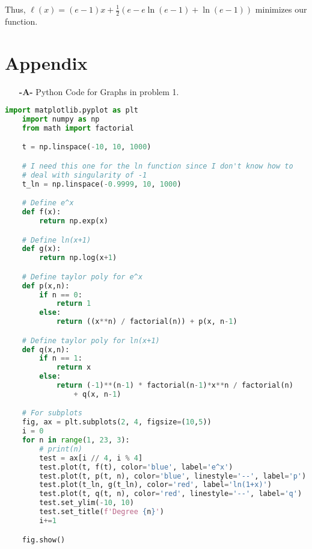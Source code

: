 \documentclass[11pt]{article}
\theoremstyle{definition}
\newcommand{\1}[1]{\mathbf{1} \left \{ #1 \right \}}
\begin{document}
Thus, \(\ell(x) = (e - 1)x + \frac{1}{2}\left(e - e\ln(e-1) + \ln(e-1)\right)\) minimizes our function.

\pagebreak

\section{Appendix}

\begin{itemize}
    \item[{\textbf{-A-}}] Python Code for Graphs in problem 1.
\end{itemize}
\begin{lstlisting}[language=Python]
    import matplotlib.pyplot as plt
    import numpy as np
    from math import factorial

    t = np.linspace(-10, 10, 1000)

    # I need this one for the ln function since I don't know how to
    # deal with singularity of -1
    t_ln = np.linspace(-0.9999, 10, 1000)

    # Define e^x
    def f(x):
        return np.exp(x)

    # Define ln(x+1)
    def g(x):
        return np.log(x+1)

    # Define taylor poly for e^x
    def p(x,n):
        if n == 0:
            return 1
        else:
            return ((x**n) / factorial(n)) + p(x, n-1)

    # Define taylor poly for ln(x+1)
    def q(x,n):
        if n == 1:
            return x
        else:
            return (-1)**(n-1) * factorial(n-1)*x**n / factorial(n)
                + q(x, n-1)

    # For subplots
    fig, ax = plt.subplots(2, 4, figsize=(10,5))
    i = 0
    for n in range(1, 23, 3):
        # print(n)
        test = ax[i // 4, i % 4]
        test.plot(t, f(t), color='blue', label='e^x')
        test.plot(t, p(t, n), color='blue', linestyle='--', label='p')
        test.plot(t_ln, g(t_ln), color='red', label='ln(1+x)')
        test.plot(t, q(t, n), color='red', linestyle='--', label='q')
        test.set_ylim(-10, 10)
        test.set_title(f'Degree {n}')
        i+=1

    fig.show()
\end{lstlisting}
\end{document}
